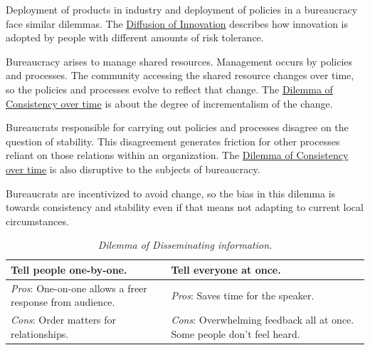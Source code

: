 Deployment of products in industry and deployment of policies in a bureaucracy face similar dilemmas. The \href{https://en.wikipedia.org/wiki/Diffusion_of_innovations}{Diffusion of Innovation} 
describes how innovation is adopted by people with different amounts of risk tolerance.

Bureaucracy arises to manage shared resources. Management occurs by policies and processes. The community accessing the shared resource changes over time, so the policies and processes evolve to reflect that change. The \hyperref[table:dilemma-personal-consistency-gradual-stepwise]{Dilemma of Consistency over time} is about the degree of incrementalism of the change.

Bureaucrats responsible for carrying out policies and processes disagree on the question of stability. This disagreement generates friction for other processes reliant on those relations within an organization.
The \hyperref[table:dilemma-personal-consistency-gradual-stepwise]{Dilemma of Consistency over time} is also disruptive to the subjects of bureaucracy. 

Bureaucrats are incentivized to avoid change, so the bias in this dilemma is towards consistency and stability even if that means not adapting to current local circumstances. 

\begin{center}
\begin{table}[H] %
\begin{tabular}{ | m{\dilemmatablewidth}| m{\dilemmatablewidth} | } 
  \hline
  \textbf{Tell people one-by-one.} & 
  \textbf{Tell everyone at once.} \\ 
  \hline
  \textit{Pros}: One-on-one allows a freer response from audience. &
  \textit{Pros}: Saves time for the speaker. \\
  \hline
  \textit{Cons}: Order matters for relationships. & 
  \textit{Cons}: Overwhelming feedback all at once. Some people don't feel heard. \\  
  \hline
\end{tabular}
\caption{
\textit{Dilemma of Disseminating information.}
}
\label{table:dilemma-personal-disseminate-one-by-one}
\end{table}
\end{center}

